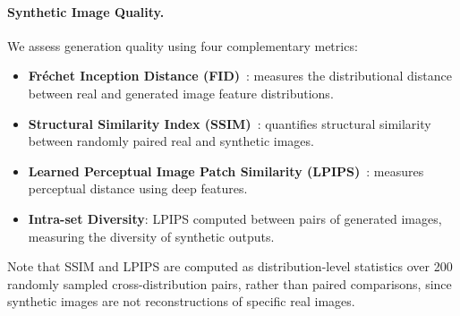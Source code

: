 \paragraph{Synthetic Image Quality.} We assess generation quality using four complementary metrics:
\begin{itemize}[leftmargin=*]
  \item \textbf{Fr\'{e}chet Inception Distance (FID)}~\cite{heusel2017gans}: measures the distributional distance between real and generated image feature distributions.
  \item \textbf{Structural Similarity Index (SSIM)}~\cite{wang2004image}: quantifies structural similarity between randomly paired real and synthetic images.
  \item \textbf{Learned Perceptual Image Patch Similarity (LPIPS)}~\cite{zhang2018perceptual}: measures perceptual distance using deep features.
  \item \textbf{Intra-set Diversity}: LPIPS computed between pairs of generated images, measuring the diversity of synthetic outputs.
\end{itemize}

Note that SSIM and LPIPS are computed as distribution-level statistics over 200 randomly sampled cross-distribution pairs, rather than paired comparisons, since synthetic images are not reconstructions of specific real images.

